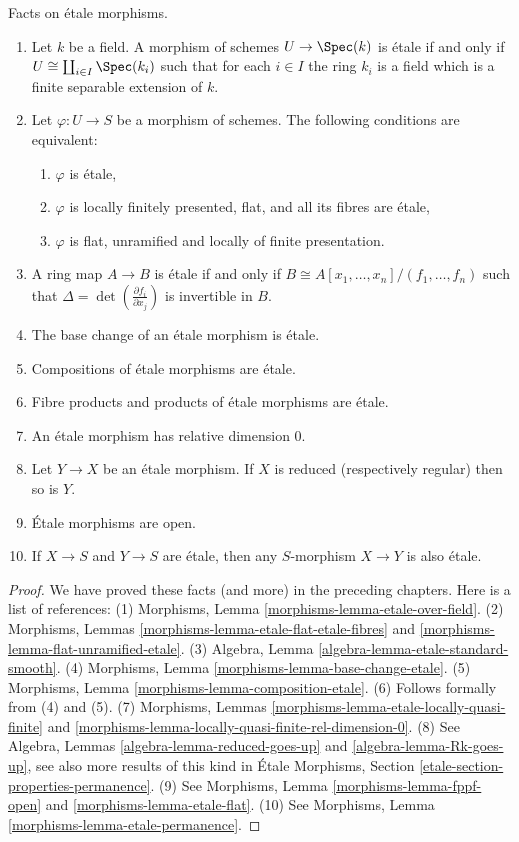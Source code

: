 \begin{proposition}
\label{proposition-etale-morphisms}
Facts on \'etale morphisms.
\begin{enumerate}
\item Let $k$ be a field. A morphism of schemes $U \to \Spec(k)$ is
\'etale if and only if $U \cong \coprod_{i \in I} \Spec(k_i)$
such that for each $i \in I$
the ring $k_i$ is a field which is a finite separable extension of $k$.
\item Let $\varphi : U \to S$ be a morphism of schemes. The following
conditions are equivalent:
\begin{enumerate}
\item $\varphi$ is \'etale,
\item $\varphi$ is locally finitely presented, flat, and all its fibres are
\'etale,
\item $\varphi$ is flat, unramified and locally of finite presentation.
\end{enumerate}
\item A ring map $A \to B$ is \'etale if and only if
$B \cong A[x_1, \ldots, x_n]/(f_1, \ldots, f_n)$
such that $\Delta = \det \left( \frac{\partial f_i}{\partial x_j} \right)$
is invertible in $B$.
\item The base change of an \'etale morphism is \'etale.
\item Compositions of \'etale morphisms are \'etale.
\item Fibre products and products of \'etale morphisms are \'etale.
\item An \'etale morphism has relative dimension 0.
\item Let $Y \to X$ be an \'etale morphism.
If $X$ is reduced (respectively regular) then so is $Y$.
\item \'Etale morphisms are open.
\item If $X \to S$ and $Y \to S$ are \'etale, then any
$S$-morphism $X \to Y$ is also \'etale.
\end{enumerate}
\end{proposition}

\begin{proof}
We have proved these facts (and more) in the preceding chapters.
Here is a list of references:
(1) Morphisms, Lemma \ref{morphisms-lemma-etale-over-field}.
(2) Morphisms, Lemmas \ref{morphisms-lemma-etale-flat-etale-fibres}
and \ref{morphisms-lemma-flat-unramified-etale}.
(3) Algebra, Lemma \ref{algebra-lemma-etale-standard-smooth}.
(4) Morphisms, Lemma \ref{morphisms-lemma-base-change-etale}.
(5) Morphisms, Lemma \ref{morphisms-lemma-composition-etale}.
(6) Follows formally from (4) and (5).
(7) Morphisms, Lemmas \ref{morphisms-lemma-etale-locally-quasi-finite}
and \ref{morphisms-lemma-locally-quasi-finite-rel-dimension-0}.
(8) See Algebra, Lemmas \ref{algebra-lemma-reduced-goes-up} and
\ref{algebra-lemma-Rk-goes-up}, see also more results of this kind
in \'Etale Morphisms, Section \ref{etale-section-properties-permanence}.
(9) See Morphisms, Lemma \ref{morphisms-lemma-fppf-open} and
\ref{morphisms-lemma-etale-flat}.
(10) See Morphisms, Lemma \ref{morphisms-lemma-etale-permanence}.
\end{proof}

